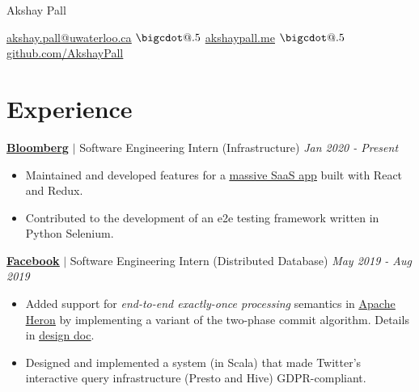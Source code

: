 \documentclass[paper=a4,fontsize=15pt]{scrartcl}
\makeatletter
\newcommand*\bigcdot{\mathpalette\bigcdot@{.5}}
\newcommand*\bigcdot@[2]{\mathbin{\vcenter{\hbox{\scalebox{#2}{$\m@th#1\bullet$}}}}}
\newcommand{\smolboispace}{\vspace*{0.1em}}
\newcommand{\halfspace}{\vspace*{0.5em}}
\newcommand{\bighalfspace}{\vspace*{0.75em}}
\newcommand{\http}[1]{\href{http://#1}{\ul{#1}}}
\newcommand{\https}[1]{\href{https://#1}{\ul{#1}}}
\newcommand{\email}[1]{\href{mailto:#1}{\ul{#1}}}
\makeatother
\begin{document}
\begin{center}
  {\fontsize{35}{40}\selectfont Akshay Pall \par}
  \halfspace
  \smolboispace
  \smolboispace

  {\normalsize
    \email{akshay.pall@uwaterloo.ca}
    $\bigcdot$ \http{akshaypall.me}
    $\bigcdot$ \https{github.com/AkshayPall}
    \par}
\end{center}

\section*{Experience}{}
\normalsize
\noindent \href{https://bloomberg.com}{\textbf{\ul{Bloomberg}}}
$\vert$ \small Software Engineering Intern (Infrastructure)
{\hfill \footnotesize \textit{Jan 2020 - Present}}
\begin{itemize}[noitemsep,leftmargin=20pt,label=\raisebox{0.25ex}{\tiny$\bullet$},topsep=5pt]
  \small
  \item Maintained and developed features for a
    \href{https://plot.ly/online-chart-maker/}{\ul{massive SaaS app}} built with
    React and Redux.
  \item Contributed to the development of an e2e testing framework written in
    Python Selenium.
\end{itemize}

\smolboispace
\smolboispace
\bighalfspace
\normalsize
\noindent \href{https://facebook.com}{\textbf{\ul{Facebook}}}
$\vert$ \small Software Engineering Intern (Distributed Database)
{\hfill \footnotesize \textit{May 2019 - Aug 2019}}
\begin{itemize}[noitemsep,leftmargin=20pt,label=\raisebox{0.25ex}{\tiny$\bullet$},topsep=5pt]
  \small
  \item Added support for \textit{end-to-end exactly-once processing} semantics
    in \href{https://apache.github.io/incubator-heron/}{\ul{Apache Heron}} by
    implementing a variant of the two-phase commit algorithm. Details in
    \href{https://docs.google.com/document/d/1Shqp2z-uAhsOUN2erbc2d-72wdjA8anp}{\ul{design
        doc}}.
  \item Designed and implemented a system (in Scala) that made Twitter's
    interactive query infrastructure (Presto and Hive) GDPR-compliant.
\end{itemize}
\end{document}

